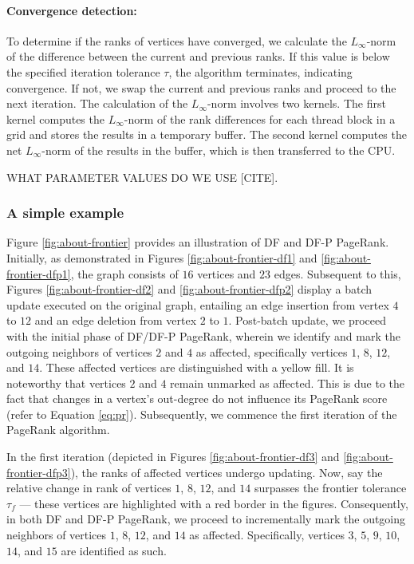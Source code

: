 \paragraph{Convergence detection:}

To determine if the ranks of vertices have converged, we calculate the $L_\infty$-norm of the difference between the current and previous ranks. If this value is below the specified iteration tolerance $\tau$, the algorithm terminates, indicating convergence. If not, we swap the current and previous ranks and proceed to the next iteration. The calculation of the $L_\infty$-norm involves two kernels. The first kernel computes the $L_\infty$-norm of the rank differences for each thread block in a grid and stores the results in a temporary buffer. The second kernel computes the net $L_\infty$-norm of the results in the buffer, which is then transferred to the CPU.

WHAT PARAMETER VALUES DO WE USE [CITE].


\subsubsection{A simple example}

Figure \ref{fig:about-frontier} provides an illustration of DF and DF-P PageRank. Initially, as demonstrated in Figures \ref{fig:about-frontier-df1} and \ref{fig:about-frontier-dfp1}, the graph consists of $16$ vertices and $23$ edges. Subsequent to this, Figures \ref{fig:about-frontier-df2} and \ref{fig:about-frontier-dfp2} display a batch update executed on the original graph, entailing an edge insertion from vertex $4$ to $12$ and an edge deletion from vertex $2$ to $1$. Post-batch update, we proceed with the initial phase of DF/DF-P PageRank, wherein we identify and mark the outgoing neighbors of vertices $2$ and $4$ as affected, specifically vertices $1$, $8$, $12$, and $14$. These affected vertices are distinguished with a yellow fill. It is noteworthy that vertices $2$ and $4$ remain unmarked as affected. This is due to the fact that changes in a vertex's out-degree do not influence its PageRank score (refer to Equation \ref{eq:pr}). Subsequently, we commence the first iteration of the PageRank algorithm.

In the first iteration (depicted in Figures \ref{fig:about-frontier-df3} and \ref{fig:about-frontier-dfp3}), the ranks of affected vertices undergo updating. Now, say the relative change in rank of vertices $1$, $8$, $12$, and $14$ surpasses the frontier tolerance $\tau_f$ --- these vertices are highlighted with a red border in the figures. Consequently, in both DF and DF-P PageRank, we proceed to incrementally mark the outgoing neighbors of vertices $1$, $8$, $12$, and $14$ as affected. Specifically, vertices $3$, $5$, $9$, $10$, $14$, and $15$ are identified as such.

